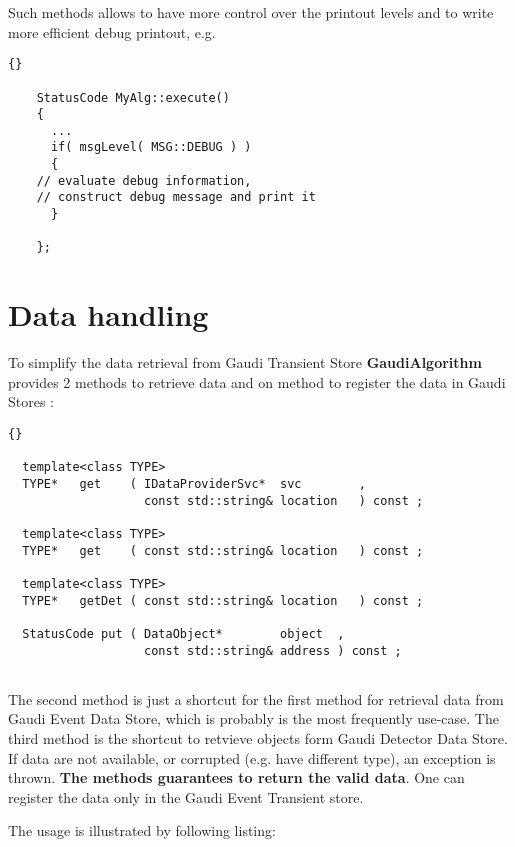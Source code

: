 \documentclass{lhcbnote}
\newcommand{\bftt}         {\ttfamily\bfseries}
\begin{document}
Such methods allows to have more control 
over the printout levels and to write more efficient debug printout, e.g.

\begin{scriptsize}
 \begin{lstlisting}{}

    StatusCode MyAlg::execute() 
    {
      ...
      if( msgLevel( MSG::DEBUG ) ) 
      {
	// evaluate debug information,
	// construct debug message and print it 
      } 

    };

 \end{lstlisting}
\end{scriptsize}


\section{Data handling}

To simplify the data retrieval from Gaudi Transient Store 
{\bftt{GaudiAlgorithm}} provides 2 methods to retrieve 
data and on method to register the data in Gaudi Stores :

\begin{scriptsize}
 \begin{lstlisting}{}

  template<class TYPE>
  TYPE*   get    ( IDataProviderSvc*  svc        , 
                   const std::string& location   ) const ;

  template<class TYPE>
  TYPE*   get    ( const std::string& location   ) const ;

  template<class TYPE>
  TYPE*   getDet ( const std::string& location   ) const ;

  StatusCode put ( DataObject*        object  , 
                   const std::string& address ) const ;
  
 \end{lstlisting}
\end{scriptsize}

The second method is just a shortcut for the first 
method for retrieval data from Gaudi Event Data Store, 
which is probably is the most frequently use-case.
The third method is the shortcut to retvieve objects form 
Gaudi Detector Data Store.  
If data are not available, or corrupted (e.g. have different type), 
an exception is thrown. {\bf{The methods guarantees to 
    return the valid data}}. One can register the data 
only in the Gaudi Event Transient store.

The usage is illustrated by following listing:
\end{document}

